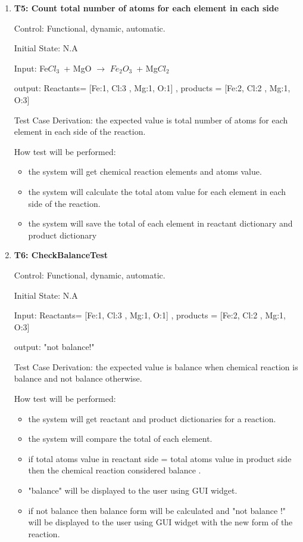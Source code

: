 \documentclass[12pt, titlepage]{article}
\begin{document}
\begin{enumerate}

\item{\bf T5: Count total number of atoms for each element in each side\\}

Control: Functional, dynamic, automatic.
					
Initial State: N.A
					
Input: Fe$Cl_3$ + MgO $\rightarrow$ $Fe_2$$O_3$ + Mg$Cl_2$ 

output: Reactants= [Fe:1, Cl:3 , Mg:1, O:1] , products = [Fe:2, Cl:2 , Mg:1, O:3] 
 
Test Case Derivation: the expected value is total number of atoms for each element in each side of the reaction. 

How test will be performed: 
\begin{itemize}
\item the system will get chemical reaction elements and atoms value. 
\item the system will calculate the total atom value for each element in each side of the reaction. 
\item the system will save the total of each element in reactant dictionary and product dictionary
\end{itemize}


\item{\bf T6: CheckBalanceTest\\}

Control: Functional, dynamic, automatic.
					
Initial State: N.A
					
Input: Reactants= [Fe:1, Cl:3 , Mg:1, O:1] , products = [Fe:2, Cl:2 , Mg:1, O:3] 

output: "not balance!"

Test Case Derivation: the expected value is balance when chemical reaction is balance and not balance otherwise. 

How test will be performed: 
\begin{itemize}
\item the system will get reactant  and product dictionaries for a reaction. 
\item the system will compare the total of each element.
\item if total atoms value in reactant side = total atoms value in product side then the chemical reaction considered balance .
\item "balance" will be displayed to the user using GUI widget. 
\item if not balance then balance form will be calculated and "not balance !" will be displayed to the user using GUI widget with the new form of the reaction.
\end{itemize}


\end{enumerate}
\end{document}
